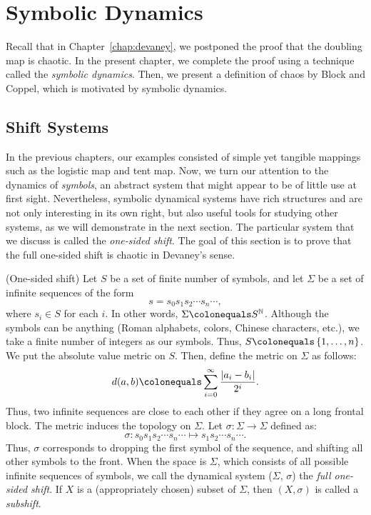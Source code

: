 \documentclass[10pt,twoside]{book}
\begin{document}
\chapter{Symbolic Dynamics}
\label{chap:symbolic}
Recall that in Chapter~\ref{chap:devaney}, we postponed the proof that the doubling map is chaotic.
In the present chapter, we complete the proof using a technique called the \textit{symbolic dynamics}.
Then, we present a definition of chaos by Block and Coppel, which is motivated by symbolic dynamics.

\section{Shift Systems}
In the previous chapters, our examples consisted of simple yet tangible mappings such as the logistic map and tent map.
Now, we turn our attention to the dynamics of \textit{symbols}, an abstract system that might appear to be of little use at first sight.
Nevertheless, symbolic dynamical systems have rich structures and are not only interesting in its own right, but also useful tools for studying other systems, as we will demonstrate in the next section.
The particular system that we discuss is called the \textit{one-sided shift}.
The goal of this section is to prove that the full one-sided shift is chaotic in Devaney's sense.
\begin{definition}
  (One-sided shift)
  Let $S$ be a set of finite number of symbols, and let $\Sigma$ be a set of infinite sequences of the form
  \begin{equation*}
    s = s_0 s_1 s_2 \cdots s_n \cdots,
  \end{equation*}
  where $s_i \in S$ for each $i$.
  In other words, $\Sigma \ceq S^\N$.
  Although the symbols can be anything (Roman alphabets, colors, Chinese characters, etc.), we take a finite number of integers as our symbols.
  Thus, $S \ceq \set{1, \ldots, n}$.
  We put the absolute value metric on $S$.
  Then, define the metric on $\Sigma$ as follows:
  \begin{equation*}
    d(a,b) \ceq \sum\limits_{i = 0}^{\infty} \frac{\abs{a_i - b_i}}{2^i}.
  \end{equation*}
  Thus, two infinite sequences are close to each other if they agree on a long frontal block.
  The metric induces the topology on $\Sigma$.
  Let $\sigma: \Sigma \to \Sigma$ defined as:
  \begin{equation*}
    \sigma: s_0 s_1 s_2 \cdots s_n \cdots
    \mapsto 
    s_1 s_2 \cdots s_n \cdots.
  \end{equation*}
  Thus, $\sigma$ corresponds to dropping the first symbol of the sequence, and shifting all other symbols to the front.
  When the space is $\Sigma$, which consists of all possible infinite sequences of symbols, we call the dynamical system ($\Sigma$, $\sigma$) the \textit{full one-sided shift}.
  If $X$ is a (appropriately chosen) subset of $\Sigma$, then $(X, \sigma)$ is called a \textit{subshift}.
\end{definition}
\end{document}
